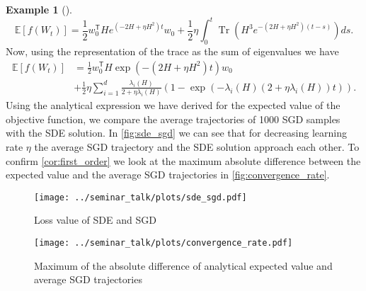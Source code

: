 \documentclass[12pt]{article}
\theoremstyle{definition}
\newtheorem{example}[example]{Example}
\numberwithin{equation}{section}
\newcommand{\R}{\mathbb{R}}
\newcommand{\T}{\mathsf{T}}
\newcommand{\ev}[1]{\mathbb{E}\left[{#1}\right]}
\DeclareMathOperator{\Tr}{Tr}
\begin{document}
\begin{example}[\autocite{liStochasticModifiedEquations2019}]
\begin{equation*}
  \ev{f(W_t)} = \frac{1}{2} w_0^\T H e^{(-2H + \eta H^2)t}w_0 + \frac{1}{2}\eta \int_0^t \Tr(H^3 e^{-(2H + \eta H^2)(t-s)})ds.
\end{equation*}
Now, using the representation of the trace as the sum of eigenvalues we have
\begin{align*}
  \ev{f(W_t)} &= \frac{1}{2}w_0^\T H \exp(-(2H + \eta H^2)t)w_0 \\
  &+ \frac{1}{2}\eta \sum_{i=1}^d \frac{\lambda_i(H)}{2 + \eta \lambda_i(H)}\left(1 - \exp(-\lambda_i(H)(2 + \eta \lambda_i(H))t)\right).
\end{align*}
Using the analytical expression we have derived for the expected value of the objective function, we compare the average trajectories of 1000 SGD samples with the SDE solution. In \autoref{fig:sde_sgd} we can see that for decreasing learning rate $\eta$ the average SGD trajectory and the SDE solution approach each other.
To confirm \autoref{cor:first_order} we look at the maximum absolute difference between the expected value and the average SGD trajectories in \autoref{fig:convergence_rate}.

\begin{figure}
  \centering
  \texttt{[image: ../seminar\_talk/plots/sde\_sgd.pdf]}
  \caption{Loss value of SDE and SGD}
  \label{fig:sde_sgd}
\end{figure}
\begin{figure}
  \centering
  \texttt{[image: ../seminar\_talk/plots/convergence\_rate.pdf]}
  \caption{Maximum of the absolute difference of analytical expected value and average SGD trajectories}
  \label{fig:convergence_rate}
\end{figure}
\end{example}
\end{document}
